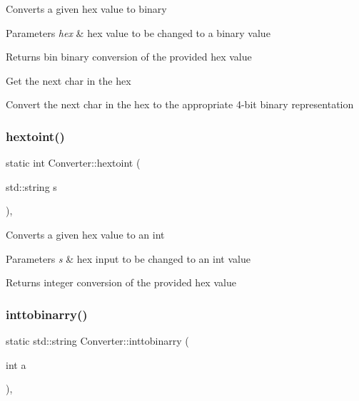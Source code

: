 Converts a given hex value to binary 
\begin{DoxyParams}{Parameters}
{\em hex} & hex value to be changed to a binary value \\
\hline
\end{DoxyParams}
\begin{DoxyReturn}{Returns}
bin binary conversion of the provided hex value 
\end{DoxyReturn}
Get the next char in the hex

Convert the next char in the hex to the appropriate 4-\/bit binary representation \mbox{\label{class_converter_a144e272d3905a27f6eb214e76f9b6b5f}} 
\subsubsection{\texorpdfstring{hextoint()}{hextoint()}}
{\footnotesize\ttfamily static int Converter\+::hextoint (\begin{DoxyParamCaption}\item[{std\+::string}]{s }\end{DoxyParamCaption})\hspace{0.3cm}{\ttfamily [inline]}, {\ttfamily [static]}}

Converts a given hex value to an int 
\begin{DoxyParams}{Parameters}
{\em s} & hex input to be changed to an int value \\
\hline
\end{DoxyParams}
\begin{DoxyReturn}{Returns}
integer conversion of the provided hex value 
\end{DoxyReturn}
\mbox{\label{class_converter_aceba1af9f263ae93e9e2b7f4f291c72b}} 
\subsubsection{\texorpdfstring{inttobinarry()}{inttobinarry()}}
{\footnotesize\ttfamily static std\+::string Converter\+::inttobinarry (\begin{DoxyParamCaption}\item[{int}]{a }\end{DoxyParamCaption})\hspace{0.3cm}{\ttfamily [inline]}, {\ttfamily [static]}}

